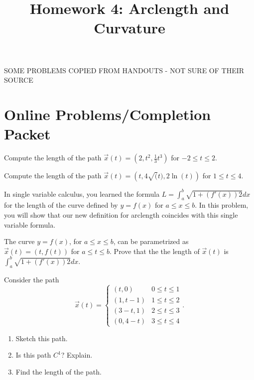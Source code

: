 \documentclass{ximera}
\title{Homework 4: Arclength and Curvature}
\begin{document}
\begin{abstract}
\end{abstract}
\maketitle

SOME PROBLEMS COPIED FROM HANDOUTS - NOT SURE OF THEIR SOURCE

\section*{Online Problems/Completion Packet}

\begin{problem}
Compute the length of the path $\vec{x}(t)=\left(2,t^2,\frac{1}{3}t^3\right)$ for $-2\leq t\leq 2$.
\end{problem}

\begin{problem}
Compute the length of the path $\vec{x}(t) = \left(t, 4\sqrt(t), 2\ln(t)\right)$ for $1\leq t\leq 4$.
\end{problem}

\begin{problem}
In single variable calculus, you learned the formula $L=\int_a^b\sqrt{1+(f'(x))2}dx$ for the length of the curve defined by $y=f(x)$ for $a\leq x\leq b$. In this problem, you will show that our new definition for arclength coincides with this single variable formula.

The curve $y=f(x)$, for $a\leq x\leq b$, can be parametrized as $\vec{x}(t) = (t,f(t))$ for $a\leq t\leq b$. Prove that the the length of $\vec{x}(t)$ is $\int_a^b\sqrt{1+(f'(x))2}dx$.
\end{problem}

\begin{problem}
Consider the path
\[
\vec{x}(t) = \begin{cases}
(t,0) & 0\leq t\leq 1\\
(1,t-1) & 1\leq t\leq 2\\
(3-t, 1) & 2\leq t\leq 3\\
(0, 4-t) & 3\leq t\leq 4
\end{cases}.
\]
\begin{enumerate}
\item Sketch this path.
\item Is this path $C^1$? Explain.
\item Find the length of the path.
\end{enumerate}
\end{problem}
\end{document}
